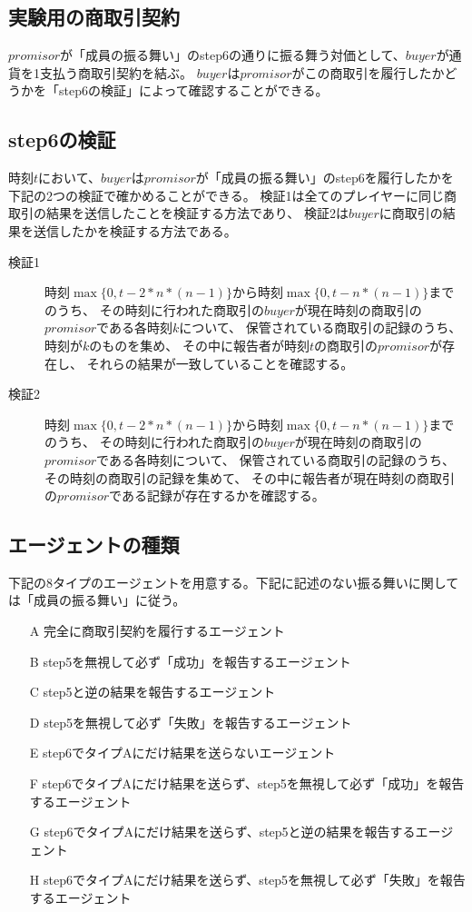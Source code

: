   \subsection{実験用の商取引契約}
  $promisor$が「成員の振る舞い」のstep6の通りに振る舞う対価として、$buyer$が通貨を1支払う商取引契約を結ぶ。
  $buyer$は$promisor$がこの商取引を履行したかどうかを「step6の検証」によって確認することができる。

  \subsection{step6の検証}
  時刻$t$において、$buyer$は$promisor$が「成員の振る舞い」のstep6を履行したかを下記の2つの検証で確かめることができる。
  検証1は全てのプレイヤーに同じ商取引の結果を送信したことを検証する方法であり、
  検証2は$buyer$に商取引の結果を送信したかを検証する方法である。
  
  \begin{description}
    \item[検証1] 時刻$\max\{0, t-2*n*(n-1)\}$から時刻$\max\{0, t-n*(n-1)\}$までのうち、
      その時刻に行われた商取引の$buyer$が現在時刻の商取引の$promisor$である各時刻$k$について、
      保管されている商取引の記録のうち、時刻が$k$のものを集め、
      その中に報告者が時刻$t$の商取引の$promisor$が存在し、
      それらの結果が一致していることを確認する。
    \item[検証2] 時刻$\max\{0, t-2*n*(n-1)\}$から時刻$\max\{0, t-n*(n-1)\}$までのうち、
      その時刻に行われた商取引の$buyer$が現在時刻の商取引の$promisor$である各時刻について、
      保管されている商取引の記録のうち、その時刻の商取引の記録を集めて、
      その中に報告者が現在時刻の商取引の$promisor$である記録が存在するかを確認する。
  \end{description}

  
  \subsection{エージェントの種類}
    下記の8タイプのエージェントを用意する。下記に記述のない振る舞いに関しては「成員の振る舞い」に従う。
    \begin{itemize}
      \item[A] 完全に商取引契約を履行するエージェント
      \item[B] step5を無視して必ず「成功」を報告するエージェント
      \item[C] step5と逆の結果を報告するエージェント
      \item[D] step5を無視して必ず「失敗」を報告するエージェント
      \item[E] step6でタイプAにだけ結果を送らないエージェント
      \item[F] step6でタイプAにだけ結果を送らず、step5を無視して必ず「成功」を報告するエージェント
      \item[G] step6でタイプAにだけ結果を送らず、step5と逆の結果を報告するエージェント
      \item[H] step6でタイプAにだけ結果を送らず、step5を無視して必ず「失敗」を報告するエージェント
    \end{itemize}

